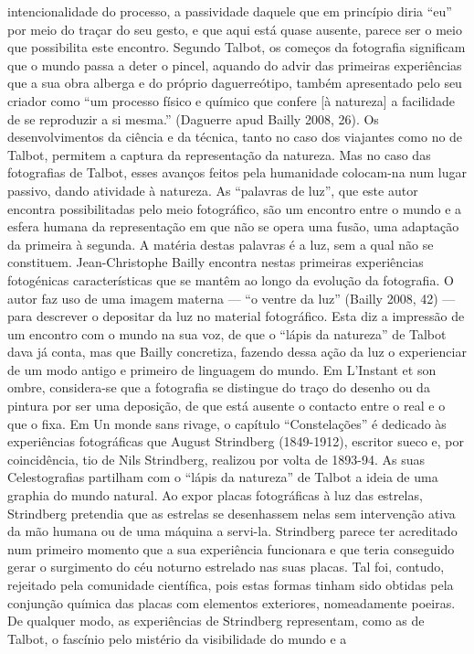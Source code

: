 \documentclass{article}
\begin{document}
intencionalidade do processo, a passividade daquele que em princípio diria “eu” por
meio do traçar do seu gesto, e que aqui está quase ausente, parece ser o meio que
possibilita este encontro. Segundo Talbot, os começos da fotografia significam que o
mundo passa a deter o pincel, aquando do advir das primeiras experiências que a
sua obra alberga e do próprio daguerreótipo, também apresentado pelo seu criador
como “um processo físico e químico que confere [à natureza] a facilidade de se reproduzir a si mesma.” (Daguerre apud Bailly 2008, 26). Os desenvolvimentos da ciência
e da técnica, tanto no caso dos viajantes como no de Talbot, permitem a captura da
representação da natureza. Mas no caso das fotografias de Talbot, esses avanços feitos pela humanidade colocam-na num lugar passivo, dando atividade à natureza. As
“palavras de luz”, que este autor encontra possibilitadas pelo meio fotográfico, são
um encontro entre o mundo e a esfera humana da representação em que não se opera
uma fusão, uma adaptação da primeira à segunda. A matéria destas palavras é a
luz, sem a qual não se constituem.
Jean-Christophe Bailly encontra nestas primeiras experiências fotogénicas características que se mantêm ao longo da evolução da fotografia. O autor faz uso de
uma imagem materna — “o ventre da luz” (Bailly 2008, 42) — para descrever o depositar da luz no material fotográfico. Esta diz a impressão de um encontro com o
mundo na sua voz, de que o “lápis da natureza” de Talbot dava já conta, mas que
Bailly concretiza, fazendo dessa ação da luz o experienciar de um modo antigo e primeiro de linguagem do mundo. Em L’Instant et son ombre, considera-se que a fotografia se distingue do traço do desenho ou da pintura por ser uma deposição, de que
está ausente o contacto entre o real e o que o fixa.
Em Un monde sans rivage, o capítulo “Constelações” é dedicado às experiências
fotográficas que August Strindberg (1849-1912), escritor sueco e, por coincidência,
tio de Nils Strindberg, realizou por volta de 1893-94. As suas Celestografias partilham com o “lápis da natureza” de Talbot a ideia de uma graphia do mundo natural.
Ao expor placas fotográficas à luz das estrelas, Strindberg pretendia que as estrelas
se desenhassem nelas sem intervenção ativa da mão humana ou de uma máquina a
servi-la. Strindberg parece ter acreditado num primeiro momento que a sua experiência funcionara e que teria conseguido gerar o surgimento do céu noturno estrelado
nas suas placas. Tal foi, contudo, rejeitado pela comunidade científica, pois estas formas tinham sido obtidas pela conjunção química das placas com elementos exteriores, nomeadamente poeiras. De qualquer modo, as experiências de Strindberg representam, como as de Talbot, o fascínio pelo mistério da visibilidade do mundo e a
\end{document}
